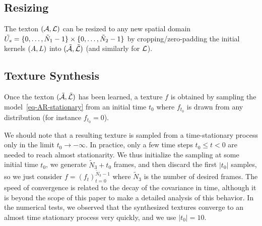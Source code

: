 \subsection{Resizing}

The texton $(\mathcal{A},\mathcal{L})$ can be resized to any new spatial domain $\tilde {U_s} = \{0,\ldots,\tilde N_1-1 \} \times \{0,\ldots,\tilde N_2 -1 \}$ by cropping/zero-padding the initial kernels $(A,L)$ into $(\tilde {\mathcal{A}}, \tilde {\mathcal{L}})$
(and similarly for $\mathcal{L}$).

\subsection{Texture Synthesis}

Once the texton $(\tilde{\mathcal{A}},\tilde{\mathcal{L}})$ has been learned, a texture $f$ is obtained by sampling the model~\eqref{eq-AR-stationary} from an initial time $t_0$
where $f_{t_0}$ is drawn from any distribution (for instance $f_{t_0}=0$).

We should note that a resulting texture is sampled from a time-stationary process only in the limit $t_0 \rightarrow -\infty$. In practice, only a few time steps $t_0 \leq t < 0$ are needed to reach almost stationarity. We thus initialize the sampling at some initial time $t_0$, we generate $\tilde N_3+t_0$ frames,  and then discard the first $|t_0|$ samples, so we just consider $f = (f_{t})_{t=0}^{\tilde N_3-1}$ where $\tilde N_3$ is the number of desired frames. The speed of convergence is related to the decay of the covariance in time, although it is beyond the scope of this paper to make a detailed analysis of this behavior.  In the numerical tests, we observed that the synthesized textures converge to an almost time stationary process very quickly, and we use $|t_0|=10$. 
